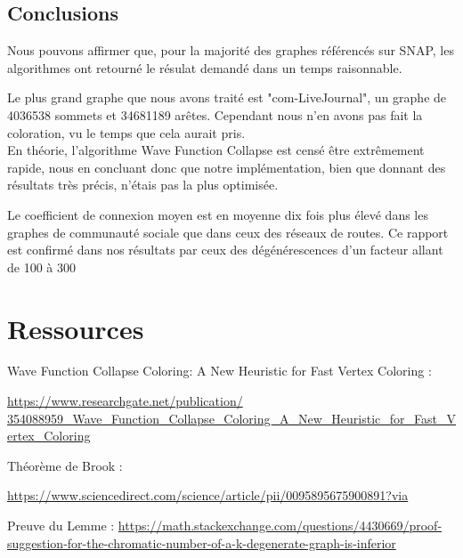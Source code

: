 

\newpage

\subsection{Conclusions }

Nous pouvons affirmer que, pour la majorité des graphes référencés sur SNAP, les algorithmes ont retourné le résulat demandé dans un temps raisonnable.


Le plus grand graphe que nous avons traité est "com-LiveJournal", un graphe de 4036538 sommets et 34681189 arêtes. Cependant nous n'en avons pas fait la coloration, vu le temps que cela aurait pris. \\
En théorie, l'algorithme Wave Function Collapse est censé être extrêmement rapide, nous en concluant donc que notre implémentation, bien que donnant des résultats très précis, n'étais pas la plus optimisée.

Le coefficient de connexion moyen est en moyenne dix fois plus élevé dans les graphes de communauté sociale que dans ceux des réseaux de routes. Ce rapport est confirmé dans nos résultats par ceux des dégénérescences d'un facteur allant de 100 à 300



\newpage



\section{Ressources}

Wave Function Collapse Coloring: A New Heuristic for Fast Vertex Coloring :

\href{https://www.researchgate.net/publication/354088959_Wave_Function_Collapse_Coloring_A_New_Heuristic_for_Fast_Vertex_Coloring}{https://www.researchgate.net/publication/\\354088959_Wave_Function_Collapse_Coloring_A_New_Heuristic_for_Fast_Vertex_Coloring}

Théorème de Brook :

\href{https://www.sciencedirect.com/science/article/pii/0095895675900891?via%3Dihub}{https://www.sciencedirect.com/science/article/pii/0095895675900891?via%
}

Preuve du Lemme : \href{https://math.stackexchange.com/questions/4430669/proof-suggestion-for-the-chromatic-number-of-a-k-degenerate-graph-is-inferior}{https://math.stackexchange.com/questions/4430669/proof-suggestion-for-the-chromatic-number-of-a-k-degenerate-graph-is-inferior}

